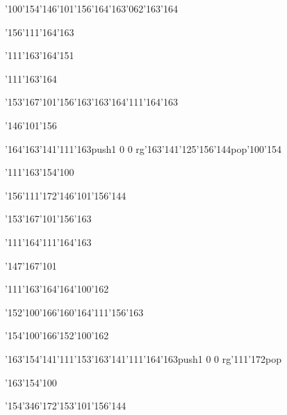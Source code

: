 \null\vfill\ipa\centerline{\enskip\char'100\char'154\enskip\char'146\char'101\char'156\enskip\char'164\char'163\char'062\char'163\char'164}\medskip\centerline{\enskip\enskip\enskip\enskip\enskip\enskip\enskip\char'156\char'111\char'164\char'163\enskip\enskip\enskip}\medskip\centerline{\enskip\char'111\enskip\char'163\char'164\char'151\enskip\enskip\enskip\enskip\enskip\enskip}\medskip\centerline{\enskip\enskip\enskip\enskip\char'111\char'163\char'164\enskip\enskip\enskip\enskip\enskip\enskip\enskip}\medskip\centerline{\enskip\enskip\enskip\enskip\enskip\char'153\char'167\char'101\char'156\char'163\enskip\char'163\char'164\char'111\char'164\char'163\enskip\enskip\enskip}\medskip\centerline{\enskip\enskip\enskip\enskip\enskip\enskip\enskip\enskip\enskip\enskip\enskip\char'146\char'101\char'156\enskip\enskip\enskip}\medskip\centerline{\enskip\char'164\char'163\char'141\char'111\char'163\enskip\enskip\enskip\enskip\pdfcolorstack\match push{1 0 0 rg}\char'163\char'141\char'125\char'156\char'144\pdfcolorstack\match pop{}\enskip\char'100\char'154}\medskip\centerline{\enskip\char'111\enskip\char'163\char'154\char'100\enskip\enskip\enskip\enskip\enskip\enskip}\medskip\centerline{\enskip\enskip\enskip\enskip\enskip\enskip\enskip\char'156\char'111\char'172\enskip\char'146\char'101\char'156\char'144}\medskip\vfill\footline{\hfil\tt\folio\hfil}\eject
\null\vfill\ipa\centerline{\enskip\enskip\enskip\enskip\enskip\enskip\enskip\enskip\char'153\char'167\char'101\char'156\char'163}\medskip\centerline{\enskip\char'111\enskip\enskip\enskip\enskip\enskip\char'164\char'111\char'164\char'163\enskip\enskip\enskip}\medskip\centerline{\enskip\enskip\enskip\char'147\char'167\char'101\enskip\enskip\enskip\enskip\enskip\enskip}\medskip\centerline{\enskip\enskip\enskip\enskip\char'111\char'163\char'164\enskip\enskip\enskip\enskip\char'164\char'100\char'162}\medskip\centerline{\enskip\char'152\char'100\char'166\enskip\char'160\char'164\char'111\char'156\char'163\enskip\enskip\enskip\enskip\enskip\enskip\enskip\enskip\enskip}\medskip\centerline{\enskip\enskip\enskip\char'154\char'100\char'166\enskip\char'152\char'100\char'162\enskip\enskip\enskip\enskip\enskip\enskip\enskip}\medskip\centerline{\enskip\char'163\char'154\char'141\char'111\char'153\enskip\enskip\enskip\enskip\char'163\char'141\char'111\char'164\char'163\enskip\pdfcolorstack\match push{1 0 0 rg}\char'111\char'172\pdfcolorstack\match pop{}}\medskip\centerline{\enskip\enskip\enskip\char'163\char'154\char'100\enskip\enskip\enskip\enskip\enskip\enskip}\medskip\centerline{\enskip\enskip\enskip\enskip\enskip\enskip\enskip\char'154\char'346\char'172\enskip\char'153\char'101\char'156\char'144}\medskip\vfill\footline{\hfil\tt\folio\hfil}\eject
